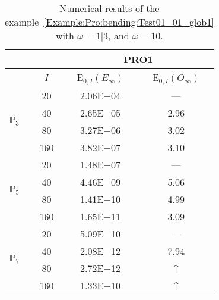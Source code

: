 \begin{table}[H]
\caption{Numerical results of the example~\ref{Example:Pro:bending:Test01_01_glob1} with $\omega=1|3$, and $\omega=10$.}
\setlength{\tabcolsep}{5pt}
\centering
\begin{tabular}{@{}l c c c@{}}
\toprule
 &  & \multicolumn{2}{c}{PRO1}\\
\midrule
 & $I$ & E$_{0,I}(E_{\infty})$ & E$_{0,I}(O_{\infty})$\\
\midrule
\multirow{4}{*}{$\mathbb{P}_{3}$} & 20 & 2.06E$-$04 & ---\\
 & 40 & 2.65E$-$05 & 2.96\\
 & 80 & 3.27E$-$06 & 3.02\\
 & 160 & 3.82E$-$07 & 3.10\\
\midrule
\multirow{4}{*}{$\mathbb{P}_{5}$} & 20 & 1.48E$-$07 & ---\\
 & 40 & 4.46E$-$09 & 5.06\\
 & 80 & 1.41E$-$10 & 4.99\\
 & 160 & 1.65E$-$11 & 3.09\\
\midrule
\multirow{4}{*}{$\mathbb{P}_{7}$} & 20 & 5.09E$-$10 & ---\\
 & 40 & 2.08E$-$12 & 7.94\\
 & 80 & 2.72E$-$12 & $\uparrow$\\
 & 160 & 1.33E$-$10 & $\uparrow$\\
\bottomrule
\end{tabular}
\label{Table:PRO:test_01_01_test16}
\end{table}
